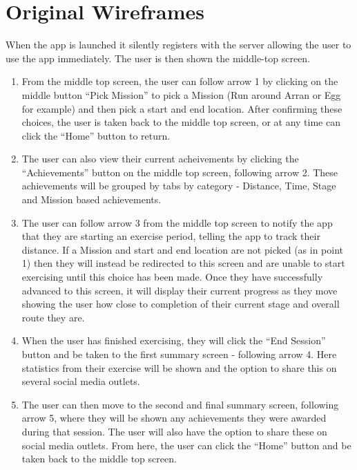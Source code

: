\chapter{Original Wireframes}
\label{ch:original_wireframes}
When the app is launched it silently registers with the server
allowing the user to use the app immediately. The user is then shown
the middle-top screen.
\begin{enumerate}
\item From the middle top screen, the user can follow arrow 1 by
  clicking on the middle button ``Pick Mission'' to pick a Mission
  (Run around Arran or Egg for example) and then pick a start and
  end location. After confirming these choices, the user is taken
  back to the middle top screen, or at any time can click the
  ``Home'' button to return. 
\item The user can also view their current acheivements by clicking
  the ``Achievements'' button on the middle top screen, following
  arrow 2. These achievements will be grouped by tabs by category -
  Distance, Time, Stage and Mission based achievements.
\item The user can follow arrow 3 from the middle top screen to
  notify the app that they are starting an exercise period, telling
  the app to track their distance. If a Mission and start and end
  location are not picked (as in point 1) then they will instead be
  redirected to this screen and are unable to start exercising until
  this choice has been made. Once they have successfully advanced to
  this screen, it will display their current progress as they move
  showing the user how close to completion of their current stage
  and overall route they are. 
\item When the user has finished exercising, they will click the
  ``End Session'' button and be taken to the first summary screen -
  following arrow 4. Here statistics from their exercise will be
  shown and the option to share this on several social media
  outlets.
\item The user can then move to the second and final summary screen,
  following arrow 5, where they will be shown any achievements they
  were awarded during that session. The user will also have the
  option to share these on social media outlets. From here, the user
  can click the ``Home'' button and be taken back to the middle top
  screen. 
\end{enumerate}
